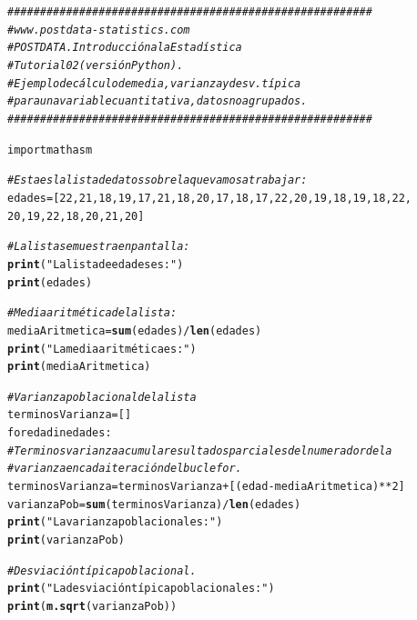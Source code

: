 \documentclass[10pt,a4paper]{article}\usepackage[]{graphicx}\usepackage[]{color}
\makeatletter
\newcommand{\hlstr}[1]{\textcolor[rgb]{0.192,0.494,0.8}{#1}}%
\newcommand{\hlcom}[1]{\textcolor[rgb]{0.678,0.584,0.686}{\textit{#1}}}%
\newcommand{\hlkwd}[1]{\textcolor[rgb]{0.737,0.353,0.396}{\textbf{#1}}}%
\newenvironment{kframe}{%
 \def\at@end@of@kframe{}%
 \ifinner\ifhmode%
  \def\at@end@of@kframe{\end{minipage}}%
  \begin{minipage}{\columnwidth}%
 \fi\fi%
 \def\FrameCommand##1{\hskip\@totalleftmargin \hskip-\fboxsep
 \colorbox{shadecolor}{##1}\hskip-\fboxsep
     \hskip-\linewidth \hskip-\@totalleftmargin \hskip\columnwidth}%
 \MakeFramed {\advance\hsize-\width
   \@totalleftmargin\z@ \linewidth\hsize
   \@setminipage}}%
 {\par\unskip\endMakeFramed%
 \at@end@of@kframe}
\newenvironment{knitrout}{}{} %
\makeatother
\begin{document}
\begin{knitrout}
\color{fgcolor}\begin{kframe}
\begin{alltt}
\hlcom{########################################################}
\hlcom{# www.postdata -statistics.com}
\hlcom{# POSTDATA. Introducción a la Estadística}
\hlcom{# Tutorial 02 (versión Python).}
\hlcom{# Ejemplo de cálculo de media, varianza y desv. típica}
\hlcom{# para una variable cuantitativa, datos no agrupados.}
\hlcom{########################################################}

import math as m

\hlcom{# Esta es la lista de datos sobre la que vamos a trabajar:}
edades = [22, 21, 18, 19, 17, 21, 18, 20, 17, 18, 17, 22, 20, 19, 18, 19, 18, 22, 
20, 19, 22, 18, 20, 21, 20]

\hlcom{# La lista se muestra en pantalla:}
\hlkwd{print}(\hlstr{"La lista de edades es:"})
\hlkwd{print}(edades)

\hlcom{# Media aritmética de la lista:}
mediaAritmetica = \hlkwd{sum}(edades) / \hlkwd{len}(edades)
\hlkwd{print}(\hlstr{"La media aritmética es:"})
\hlkwd{print}(mediaAritmetica)

\hlcom{# Varianza poblacional de la lista}
terminosVarianza = []
for edad in edades:
\hlcom{  # Terminos varianza acumula resultados parciales del numerador de la }
\hlcom{  # varianza en cada iteración del bucle for.}
  terminosVarianza = terminosVarianza + [(edad - mediaAritmetica)**2] 
varianzaPob = \hlkwd{sum}(terminosVarianza) / \hlkwd{len}(edades)
\hlkwd{print}(\hlstr{"La varianza poblacional es:"})
\hlkwd{print}(varianzaPob)

\hlcom{# Desviación típica poblacional.}
\hlkwd{print}(\hlstr{"La desviación típica poblacional es:"})
\hlkwd{print}(\hlkwd{m.sqrt}(varianzaPob))
\end{alltt}
\end{kframe}
\end{knitrout}
\end{document}
